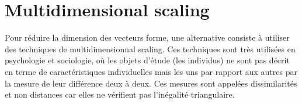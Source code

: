 







\section{Multidimensional scaling}

Pour r\'eduire la dimension des vecteurs forme, une alternative
consiste \`a utiliser des techniques de
multidimensionnal scaling. Ces techniques sont tr\`es
utilis\'ees en psychologie et sociologie, o\`u les objets
d'\'etude (les individus) ne sont pas d\'ecrit en terme de
caract\'eristiques individuelles mais les uns par 
rapport aux autres par la mesure de leur diff\'erence deux \`a 
deux. Ces  mesures sont appel\'ees dissimilarit\'es et 
non distances car elles ne v\'erifient pas l'in\'egalit\'e 
triangulaire. 

